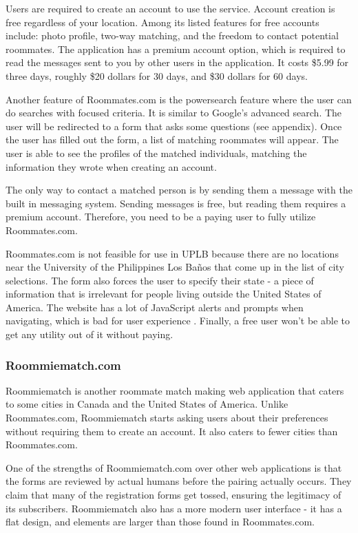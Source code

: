 \documentclass[journal]{./IEEE/IEEEtran}
\newcommand{\UPLB}{University of the Philippines Los Ba\~{n}os }
\begin{document}
        Users are required to create an account to use the service. Account creation is free regardless of your location. Among
        its listed features for free accounts include: photo profile, two-way matching, and the freedom to contact potential
        roommates. The application has a premium account option, which is required to read the messages sent to you by other
        users in the application. It costs \$5.99 for three days, roughly \$20 dollars for 30 days, and \$30 dollars for 60
        days. 

        Another feature of Roommates.com is the powersearch feature where the user can do searches with focused criteria. It is
        similar to Google's advanced search. The user will be redirected to a form that asks some questions (see appendix). Once
        the user has filled out the form, a list of matching roommates will appear. The user is able to see the profiles of the
        matched individuals, matching the information they wrote when creating an account. 

        The only way to contact a matched person is by sending them a message with the built in messaging system. Sending
        messages is free, but reading them requires a premium account. Therefore, you need to be a paying user to fully utilize
        Roommates.com.

        Roommates.com is not feasible for use in UPLB because there are no locations near the \UPLB that come up in the list of
        city selections. The form also forces the user to specify their state - a piece of information that is irrelevant for
        people living outside the United States of America. The website has a lot of JavaScript alerts and prompts when
        navigating, which is bad for user experience \cite{UX1}. Finally, a free user won't be able to get any utility out of it
        without paying.

        \subsubsection{Roommiematch.com}
        Roommiematch is another roommate match making web application that caters to some cities in Canada and the United States
        of America. Unlike Roommates.com, Roommiematch starts asking users about their preferences without requiring them to
        create an account. It also caters to fewer cities than Roommates.com.

        One of the strengths of Roommiematch.com over other web applications is that the forms are reviewed by actual humans
        before the pairing actually occurs. They claim that many of the registration forms get tossed, ensuring the legitimacy
        of its subscribers. Roommiematch also has a more modern user interface - it has a flat design, and elements are larger
        than those found in Roommates.com.
\end{document}
